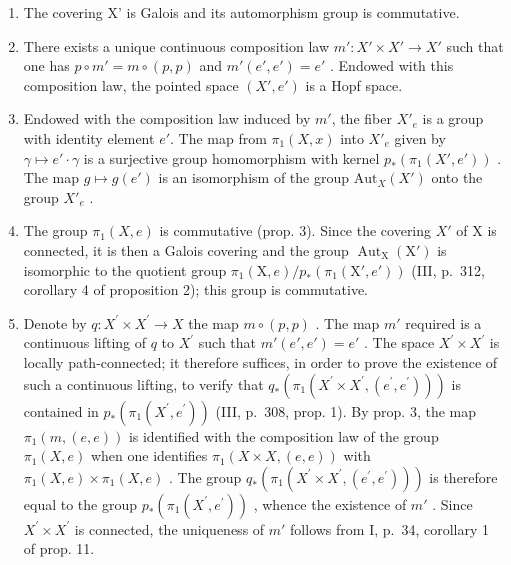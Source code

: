 \begin{enumerate}
\def\labelenumi{\alph{enumi})}
\item
  The covering X' is Galois and its automorphism group is commutative.
\item
  There exists a unique continuous composition law \(m' \colon X' \times X' \to X'\) such that one has \(p \circ m' = m \circ (p, p)\) and \(m'(e', e') = e'\) . Endowed with this composition law, the pointed space \((X', e')\) is a Hopf space.
\item
  Endowed with the composition law induced by \(m'\), the fiber \(X'_e\) is a group with identity element \(e'\). The map from \(\pi_1(X, x)\) into \(X'_e\) given by \(\gamma \mapsto e' \cdot \gamma\) is a surjective group homomorphism with kernel \(p_*(\pi_1(X', e'))\) . The map \(g \mapsto g(e')\) is an isomorphism of the group \(\text{Aut}_X(X')\) onto the group \(X'_e\) .
\item
  The group \(\pi_{1}(X,e)\) is commutative (prop. 3). Since the covering \(X'\) of X is connected, it is then a Galois covering and the group \(\operatorname{Aut}_{\mathrm{X}}(\mathrm{X}')\) is isomorphic to the quotient group \(\pi_{1}(\mathrm{X},e)/p_{*}(\pi_{1}(\mathrm{X}',e'))\) (III, p.~312, corollary 4 of proposition 2); this group is commutative.
\item
  Denote by \(q\colon X^{\prime}\times X^{\prime}\to X\) the map \(m\circ (p,p)\) . The map \(m'\) required is a continuous lifting of \(q\) to \(X^{\prime}\) such that \(m'(e',e') = e'\) . The space \(X^{\prime}\times X^{\prime}\) is locally path-connected; it therefore suffices, in order to prove the existence of such a continuous lifting, to verify that \(q_{*}(\pi_{1}(X^{\prime}\times X^{\prime},(e^{\prime},e^{\prime})))\) is contained in \(p_{*}(\pi_{1}(X^{\prime},e^{\prime}))\) (III, p.~308, prop. 1). By prop. 3, the map \(\pi_1(m,(e,e))\) is identified with the composition law of the group \(\pi_1(X,e)\) when one identifies \(\pi_1(X\times X,(e,e))\) with \(\pi_1(X,e)\times \pi_1(X,e)\) . The group \(q_{*}(\pi_{1}(X^{\prime}\times X^{\prime},(e^{\prime},e^{\prime})))\) is therefore equal to the group \(p_{*}(\pi_{1}(X^{\prime},e^{\prime}))\) , whence the existence of \(m'\) . Since \(X^{\prime}\times X^{\prime}\) is connected, the uniqueness of \(m'\) follows from I, p.~34, corollary 1 of prop. 11.
\end{enumerate}

